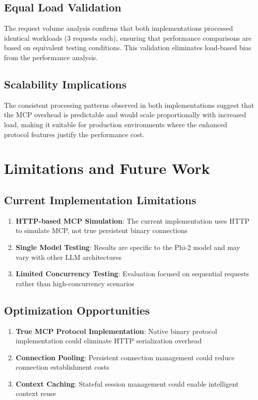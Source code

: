 \subsection{Equal Load Validation}

The request volume analysis confirms that both implementations processed identical workloads (3 requests each), ensuring that performance comparisons are based on equivalent testing conditions. This validation eliminates load-based bias from the performance analysis.

\subsection{Scalability Implications}

The consistent processing patterns observed in both implementations suggest that the MCP overhead is predictable and would scale proportionally with increased load, making it suitable for production environments where the enhanced protocol features justify the performance cost.

\section{Limitations and Future Work}

\subsection{Current Implementation Limitations}

\begin{enumerate}
    \item \textbf{HTTP-based MCP Simulation}: The current implementation uses HTTP to simulate MCP, not true persistent binary connections
    \item \textbf{Single Model Testing}: Results are specific to the Phi-2 model and may vary with other LLM architectures
    \item \textbf{Limited Concurrency Testing}: Evaluation focused on sequential requests rather than high-concurrency scenarios
\end{enumerate}

\subsection{Optimization Opportunities}

\begin{enumerate}
    \item \textbf{True MCP Protocol Implementation}: Native binary protocol implementation could eliminate HTTP serialization overhead
    \item \textbf{Connection Pooling}: Persistent connection management could reduce connection establishment costs
    \item \textbf{Context Caching}: Stateful session management could enable intelligent context reuse
\end{enumerate}

